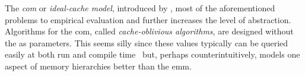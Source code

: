 The \emph{\gls{com}} or \emph{ideal-cache model}, introduced by
\textcite{coa-for-publication},  most of the
aforementioned problems to empirical evaluation and further increases the level of
abstraction.
%
Algorithms for the \gls{com}, called \emph{cache-oblivious algorithms}, are designed
without the 
as parameters.  This seems silly since these values typically can be queried easily
 at both run and compile time~\cite[50]{drepper2007}
but, perhaps counterintuitively, models one aspect of memory hierarchies better than the
\gls{emm}.
%
%
%
%
%
